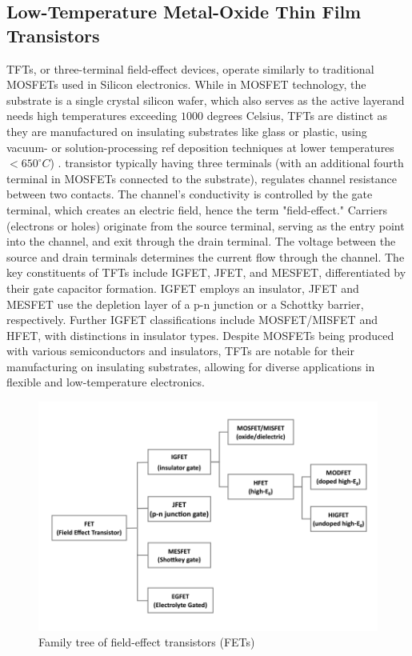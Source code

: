 \subsection {Low-Temperature Metal-Oxide Thin Film Transistors}  
TFTs, or three-terminal field-effect devices, operate similarly to traditional MOSFETs used in Silicon electronics. While in MOSFET technology, the substrate is a single crystal silicon wafer, which also serves as the active layerand needs high temperatures exceeding $1000$ degrees Celsius, TFTs are distinct as they are manufactured on insulating substrates like glass or plastic, using vacuum- or solution-processing ref deposition techniques  at lower temperatures$ <650^  { \circ} C$) .  
transistor typically having three terminals (with an additional fourth terminal in MOSFETs connected to the substrate), regulates channel resistance between two contacts. The channel's conductivity is controlled by the gate terminal, which creates an electric field, hence the term "field-effect." Carriers (electrons or holes) originate from the source terminal, serving as the entry point into the channel, and exit through the drain terminal. The voltage between the source and drain terminals determines the current flow through the channel. 
The key constituents of TFTs include IGFET, JFET, and MESFET, differentiated by their gate capacitor formation. IGFET employs an insulator, JFET and MESFET use the depletion layer of a p-n junction or a Schottky barrier, respectively. Further IGFET classifications include MOSFET/MISFET and HFET, with distinctions in insulator types. Despite MOSFETs being produced with various semiconductors and insulators, TFTs are notable for their manufacturing on insulating substrates, allowing for diverse applications in flexible and low-temperature electronics.

    \begin{figure}[h!]
\centering
\includegraphics[width=1\textwidth]{figures/fig10.png}
\caption[Example of caption.]{Family tree of field-effect transistors (FETs) \label{fig14}}
\end{figure}
    

